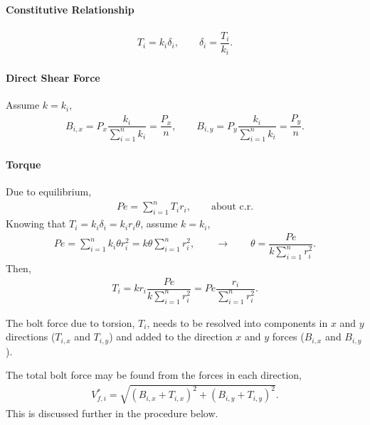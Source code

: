 \paragraph{Constitutive Relationship}
\begin{gather}
T_i=k_i\delta_i,\qquad\delta_i=\dfrac{T_i}{k_i}.
\end{gather}
\paragraph{Direct Shear Force}
Assume $k=k_i$,
\begin{gather}
B_{i,x}=P_x\dfrac{k_i}{\sum_{i=1}^nk_i}=\dfrac{P_x}{n},\qquad
B_{i,y}=P_y\dfrac{k_i}{\sum_{i=1}^nk_i}=\dfrac{P_y}{n}.
\end{gather}
\paragraph{Torque}
Due to equilibrium,
\begin{gather}
Pe=\sum_{i=1}^nT_ir_i,\qquad\text{about c.r.}
\end{gather}
Knowing that $T_i=k_i\delta_i=k_ir_i\theta$, assume $k=k_i$,
\begin{gather}
Pe=\sum_{i=1}^nk_i\theta{}r_i^2=k\theta\sum_{i=1}^nr_i^2,\qquad\longrightarrow\qquad
\theta=\dfrac{Pe}{k\sum_{i=1}^nr_i^2}.
\end{gather}
Then,
\begin{gather}
T_i=kr_i\dfrac{Pe}{k\sum_{i=1}^nr_i^2}=Pe\dfrac{r_i}{\sum_{i=1}^nr_i^2}.
\end{gather}

The bolt force due to torsion, $T_i$, needs to be resolved into components in $x$ and $y$ directions ($T_{i,x}$ and $T_{i,y}$) and added to the direction $x$ and $y$ forces ($B_{i,x}$ and $B_{i,y}$).
\begin{figure}[H]
\centering
\end{figure}
The total bolt force may be found from the forces in each direction,
\begin{gather}
V_{f,i}^*=\sqrt{\left(B_{i,x}+T_{i,x}\right)^2+\left(B_{i,y}+T_{i,y}\right)^2}.
\end{gather}
This is discussed further in the procedure below.
